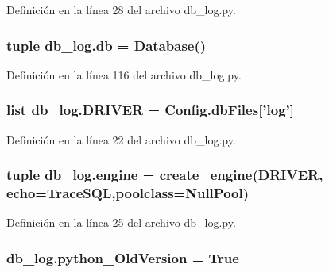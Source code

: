 Definición en la línea 28 del archivo db\-\_\-log.\-py.

\hypertarget{namespacedb__log_aba9234ce5907ed35a58854aa5f6fd18c}{
\subsubsection[{db}]{\setlength{\rightskip}{0pt plus 5cm}tuple db\-\_\-log.\-db = {\bf Database}()}}\label{namespacedb__log_aba9234ce5907ed35a58854aa5f6fd18c}


Definición en la línea 116 del archivo db\-\_\-log.\-py.

\hypertarget{namespacedb__log_aca93446ca8bacea6ca9dd645f0530ba3}{
\subsubsection[{D\-R\-I\-V\-E\-R}]{\setlength{\rightskip}{0pt plus 5cm}list db\-\_\-log.\-D\-R\-I\-V\-E\-R = {\bf Config.\-db\-Files}\mbox{[}'log'\mbox{]}}}\label{namespacedb__log_aca93446ca8bacea6ca9dd645f0530ba3}


Definición en la línea 22 del archivo db\-\_\-log.\-py.

\hypertarget{namespacedb__log_a42129d882358fd3e758cc0a07676f45d}{
\subsubsection[{engine}]{\setlength{\rightskip}{0pt plus 5cm}tuple db\-\_\-log.\-engine = create\-\_\-engine({\bf D\-R\-I\-V\-E\-R}, echo={\bf Trace\-S\-Q\-L},poolclass=Null\-Pool)}}\label{namespacedb__log_a42129d882358fd3e758cc0a07676f45d}


Definición en la línea 25 del archivo db\-\_\-log.\-py.

\hypertarget{namespacedb__log_afc79f78c97078e4f04bab40c7263cdda}{
\subsubsection[{python\-\_\-\-Old\-Version}]{\setlength{\rightskip}{0pt plus 5cm}db\-\_\-log.\-python\-\_\-\-Old\-Version = True}}\label{namespacedb__log_afc79f78c97078e4f04bab40c7263cdda}


